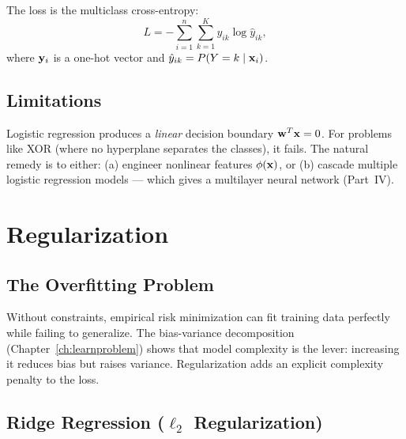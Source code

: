 \documentclass[oneside]{book}
\begin{document}


The loss is the multiclass cross-entropy:
\[
L = -\sum_{i=1}^n \sum_{k=1}^K y_{ik}\log\hat{y}_{ik},
\]
where $\mathbf{y}_i$ is a one-hot vector and $\hat{y}_{ik} = P(Y=k\mid\mathbf{x}_i)$.

\section{Limitations}

Logistic regression produces a \emph{linear} decision boundary $\mathbf{w}^T\mathbf{x} = 0$. For problems like XOR (where no hyperplane separates the classes), it fails. The natural remedy is to either: (a) engineer nonlinear features $\phi(\mathbf{x})$, or (b) cascade multiple logistic regression models --- which gives a multilayer neural network (Part~IV).

\chapter{Regularization}
\label{ch:regularization}

\section{The Overfitting Problem}

Without constraints, empirical risk minimization can fit training data perfectly while failing to generalize. The bias-variance decomposition (Chapter~\ref{ch:learnproblem}) shows that model complexity is the lever: increasing it reduces bias but raises variance. Regularization adds an explicit complexity penalty to the loss.

\section{Ridge Regression ($\ell_2$ Regularization)}

\end{document}
